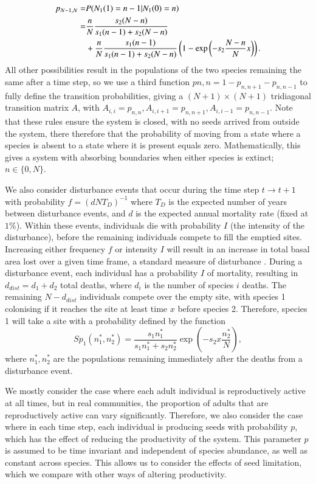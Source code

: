 \documentclass[a4paper]{article}
\begin{document}
\begin{align}
\label{decrease}
p_{N-1,N}=&P(N_1(1)=n-1 | N_1(0)=n)  \\ 
=&\frac{n}{N}\frac{s_2 (N-n)}{s_1 (n-1) +s_2(N-n)} \notag \\
& + \frac{n}{N}\frac{s_1 (n-1)}{s_1 (n-1) +s_2(N-n)}\left(1-\exp \left( -s_2 \frac{N-n}{N} x\right)\right). \notag \end{align}
All other possibilities result in the populations of the two species remaining the same after a time step, so we use a third function $p{n,n}=1-p_{n,n+1}-p_{n,n-1}$ to fully define the transition probabilities, giving a $(N+1) \times (N+1)$ tridiagonal transition matrix $A$, with $A_{i,i}=p_{n,n}, A_{i,i+1}=p_{n,n+1}, A_{i,i-1}=p_{n,n-1}$. Note that these rules ensure the system is closed, with no seeds arrived from outside the system, there therefore that the probability of moving from a state where a species is absent to a state where it is present equals zero. Mathematically, this gives a system with absorbing boundaries when either species is extinct; $n \in \{0,N\}$.

We also consider disturbance events that occur during the time step $t \to t+1$ with probability $f=(dNT_D)^{-1}$ where $T_D$ is the expected number of years between disturbance events, and $d$ is the expected annual mortality rate (fixed at $1\%$). Within these events, individuals die with probability $I$ (the intensity of the disturbance), before the remaining individuals compete to fill the emptied sites. Increasing either frequency $f$ or intensity $I$ will result in an increase in total basal area lost over a given time frame, a standard measure of disturbance \citep[e.g.][]{molino2001tree,peterson1997tornado}. During a disturbance event, each individual has a probability $I$ of mortality, resulting in $d_{dist}=d_1+d_2$ total deaths, where $d_i$ is the number of species $i$ deaths. The remaining $N-d_{dist}$ individuals compete over the empty site, with species 1 colonising if it reaches the site at least time $x$ before species 2. Therefore, species 1 will take a site with a probability defined by the function
\begin{equation}
\label{sp1}
Sp_1(n_1^*,n_2^*)=\frac{s_1 n_1^*}{s_1n_1^*+s_2n_2^*}\exp \left(-s_2 x\frac{n_2^*}{N}\right),
\end{equation}
where $n_1^*,n_2^*$ are the populations remaining immediately after the deaths from a disturbance event.

We mostly consider the case where each adult individual is reproductively active at all times, but in real communities, the proportion of adults that are reproductively active can vary significantly. Therefore, we also consider the case where in each time step, each individual is producing seeds with probability $p$, which has the effect of reducing the productivity of the system. This parameter $p$ is assumed to be time invariant and independent of species abundance, as well as constant across species. This allows us to consider the effects of seed limitation, which we compare with other ways of altering productivity. 
\end{document}

